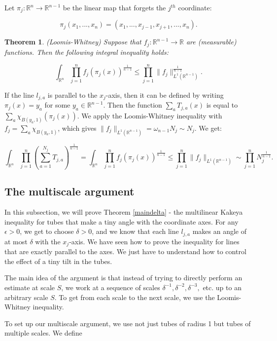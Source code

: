 \documentclass{amsart}
\newtheorem{theorem}[prop]{Theorem}
\newcommand{\eps}{\epsilon}
\newcommand{\RR}{\mathbb{R}}
\begin{document}
Let $\pi_j: \RR^n \rightarrow \RR^{n-1}$ be the linear map that forgets the $j^{th}$ coordinate: 

$$ \pi_j( x_1, ..., x_n) = (x_1, ..., x_{j-1}, x_{j+1}, ..., x_n). $$

\begin{theorem} (Loomis-Whitney)  Suppose that $f_j: \RR^{n-1} \rightarrow \RR$ are (measurable) functions.  Then the following integral inequality holds:

$$ \int_{\RR^n} \prod_{j=1}^n f_j \left( \pi_j(x) \right)^\frac{1}{n-1} \le \prod_{j=1}^n \| f_j \|_{L^1(\RR^{n-1})}^{\frac{1}{n-1}}. $$

\end{theorem}

If the line $l_{j,a}$ is parallel to the $x_j$-axis, then it can be defined by writing $\pi_j(x) = y_a$ for some $y_a \in \RR^{n-1}$.  Then the function $\sum_{a} T_{j,a}(x)$ is equal to $\sum_{a} \chi_{B(y_a, 1)} (\pi_j (x))$.  We apply the Loomis-Whitney inequality with $f_j = \sum_{a} \chi_{B(y_a, 1)}$, which gives $\| f_j \|_{L^1(\RR^{n-1})} = \omega_{n-1} N_j \sim N_j$.  We get:

$$ \int_{\RR^n} \prod_{j=1}^n \left( \sum_{a = 1}^{N_j}  T_{j,a} \right)^{\frac{1}{n-1}} =
\int_{\RR^n} \prod_{j=1}^n f_j (\pi_j(x))^{\frac{1}{n-1}} \le \prod_{j=1}^n \| f_j \|_{L^1(\RR^{n-1})} \sim \prod_{j=1}^n N_j^{\frac{1}{n-1}}. $$

\subsection{The multiscale argument}

In this subsection, we will prove Theorem \ref{maindelta} - the multilinear Kakeya inequality for tubes that make a tiny angle with the coordinate axes.  For any $\eps > 0$, we get to choose $\delta > 0$, and we know that each line $l_{j,a}$ makes an angle of at most $\delta$ with the $x_j$-axis.  
We have seen how to prove the inequality for lines that are exactly parallel to the axes.  We just have to understand how to control the effect of a tiny tilt in the tubes.  

The main idea of the argument is that instead of trying to directly perform an estimate at scale $S$, we work at a sequence of scales $\delta^{-1}, \delta^{-2}, \delta^{-3}, $ etc.  up to an arbitrary scale $S$.  To get from each scale to the next scale, we use the Loomis-Whitney inequality.

To set up our multiscale argument, we use not just tubes of radius 1 but tubes of multiple scales.  We define
\end{document}
